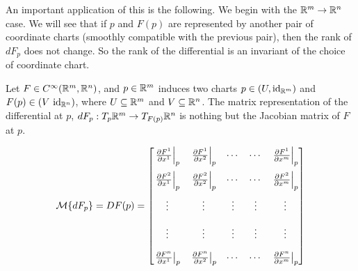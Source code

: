 \documentclass[../main-manifolds.tex]{subfiles}
\begin{document}

An important application of this is the following. We begin with the ${\mathbb{R}^m}\to{\mathbb{R}^n}$ case. We will see that if $p$ and $F(p)$ are represented by another pair of coordinate charts (smoothly compatible with the previous pair), then the rank of $dF_p$ does not change. So the rank of the differential is an invariant of the choice of coordinate chart.

\begin{definition}
Let $F\in \cinf[\realm,\realn]$, and $p\in{\mathbb{R}^m}$ induces two charts $p\in (U,\operatorname{id}_{{\mathbb{R}^m}})$ and $F(p)\in(V\,\operatorname{id}_{{\mathbb{R}^n}})$, where $U\subseteq{\mathbb{R}^m}$ and $V\subseteq{\mathbb{R}^n}$. The matrix representation of the differential at $p$, $dF_p: T_p{\mathbb{R}^m}\to T_{F(p)}{\mathbb{R}^n}$ is nothing but the Jacobian matrix of $F$ at $p$.

\begin{equation}\label{lee-chap3:euclidean-differential-jacobian}
    \mcal\{dF_p\} = DF(p) = \begin{bmatrix}
        \eval{\pdv{F^1}{x^1}}_{p} & \eval{\pdv{F^1}{x^2}}_{p} & \cdots & \cdots & \eval{\pdv{F^1}{x^m}}_{p} \\[1em] \eval{\pdv{F^2}{x^1}}_{p} & \eval{\pdv{F^2}{x^2}}_{p} & \cdots & \cdots & \eval{\pdv{F^2}{x^m}}_{p} \\[1em] \vdots & \vdots & \vdots & \vdots & \vdots \\[1em] \vdots & \vdots & \vdots & \vdots & \vdots \\[1em] \eval{\pdv{F^n}{x^1}}_{p} & \eval{\pdv{F^n}{x^2}}_{p} & \cdots & \cdots & \eval{\pdv{F^n}{x^m}}_{p}
    \end{bmatrix}
\end{equation}

\end{definition}
\end{document}
